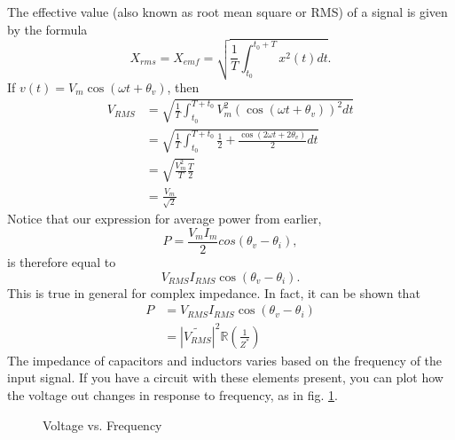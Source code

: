 \documentclass[nobib]{tufte-handout}
\begin{document}
The effective value (also known as root mean 
square or RMS) of a signal is given by the formula 
\[X_{rms} = X_{emf} = \sqrt{\frac{1}{T}\int_{t_0}^{t_0+T} x^2(t) dt}.\]
If $v(t) = V_m \cos(\omega t + \theta_v)$, then 
\begin{align*}
    V_{RMS} &= \sqrt{\frac{1}{T} \int_{t_0}^{T + t_0} V_m^2 (\cos(\omega t + \theta_v))^2 dt} \\
    &= \sqrt{\frac{1}{T} \int_{t_0}^{T + t_0} \frac{1}{2} + \frac{\cos(2 \omega t + 2 \theta_v)}{2} dt} \\
    &= \sqrt{\frac{V_m^2}{T} \frac{T}{2}} \\
    &= \frac{V_m}{\sqrt{2}}
\end{align*}
Notice that our expression for average power
from earlier, 
\[P = \frac{V_m I_m}{2} cos(\theta_v - \theta_i),\]
is therefore equal to 
\[V_{RMS} I_{RMS} \cos(\theta_v - \theta_i).\]
This is true in general for complex impedance. 
In fact, it can be shown that 
\begin{align*}
    P &= V_{RMS} I_{RMS} \cos(\theta_v - \theta_i) \\
    &= |\tilde{V_{RMS}}|^2 \mathbb{R}(\frac{1}{Z^*})
\end{align*}
The impedance of capacitors and inductors 
varies based on the frequency of the input signal. 
If you have a circuit with these elements present, 
you can plot how the voltage out changes in response to frequency, as 
in fig. \ref{fig:vf}.
\begin{figure}
    \center 
    \caption{Voltage vs. Frequency}
    \label{fig:vf}
\end{figure}
\end{document}
